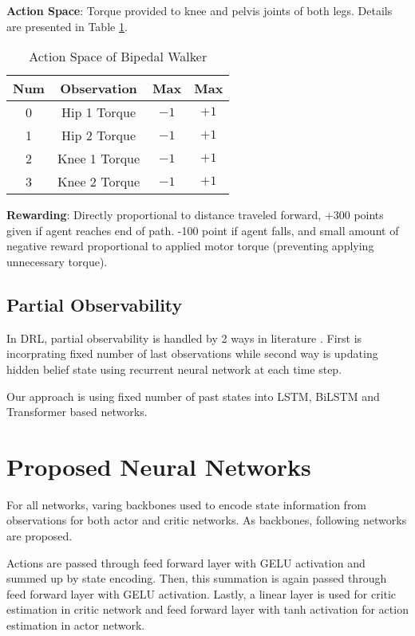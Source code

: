 \textbf{Action Space}: Torque provided to knee and pelvis joints of both legs. Details are presented in Table \ref{table:bpw_act_space}.

\begin{table}[h!]
	\begin{center}
		\begin{tabular}{cccc}
			\textbf{Num} & \textbf{Observation} & \textbf{Max} & \textbf{Max} \\
			\hline
			0  & Hip 1 Torque & $-1$ & $+1$ \\
			1  & Hip 2 Torque & $-1$ & $+1$ \\
			2  & Knee 1 Torque & $-1$ & $+1$ \\
			3  & Knee 2 Torque & $-1$ & $+1$ \\
		\end{tabular}
	\end{center}
	\caption{Action Space of Bipedal Walker}
	\label{table:bpw_act_space}
\end{table}

\textbf{Rewarding}: Directly proportional to distance traveled forward, +300 points given if agent reaches end of path. -100 point if agent falls, and small amount of negative reward proportional to applied motor torque (preventing applying unnecessary torque).

\subsection{Partial Observability}
In DRL, partial observability is handled by 2 ways in literature \cite{dulac-arnold_challenges_2019}. First is incorprating fixed number of last observations while second way is updating hidden belief state using recurrent neural network at each time step. 

Our approach is using fixed number of past states into LSTM, BiLSTM and Transformer based networks. 

\section{Proposed Neural Networks}

For all networks, varing backbones used to encode state information from observations for both actor and critic networks. As backbones, following networks are proposed.

Actions are passed through feed forward layer with GELU activation and summed up by state encoding. Then, this summation is again passed through feed forward layer with GELU activation. Lastly, a linear layer is used for critic estimation in critic network and feed forward layer with tanh activation for action estimation in actor network.

